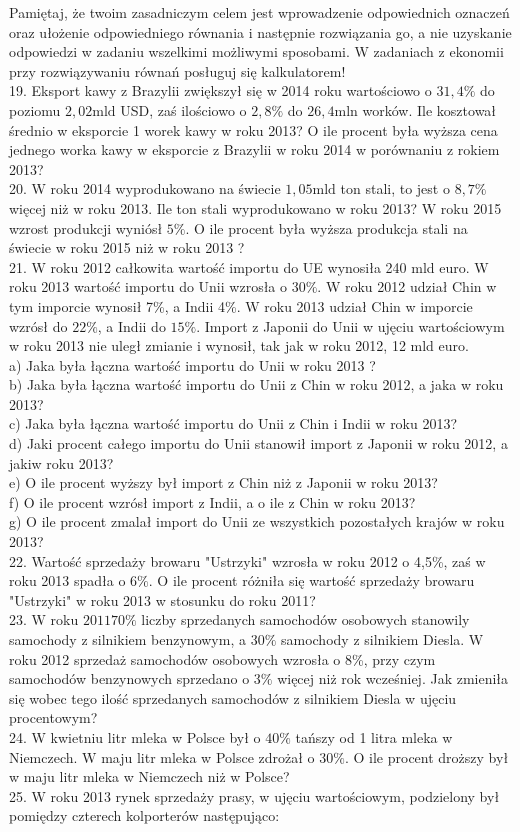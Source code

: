 \documentclass[10pt]{article}
\begin{document}
Pamiętaj, że twoim zasadniczym celem jest wprowadzenie odpowiednich oznaczeń oraz ułożenie odpowiedniego równania i następnie rozwiązania go, a nie uzyskanie odpowiedzi w zadaniu wszelkimi możliwymi sposobami. W zadaniach z ekonomii przy rozwiązywaniu równań posługuj się kalkulatorem!\\
19. Eksport kawy z Brazylii zwiększył się w 2014 roku wartościowo o \(31,4 \%\) do poziomu \(2,02 \mathrm{mld}\) USD, zaś ilościowo o \(2,8 \%\) do \(26,4 \mathrm{mln}\) worków. Ile kosztował średnio w eksporcie 1 worek kawy w roku 2013? O ile procent była wyższa cena jednego worka kawy w eksporcie z Brazylii w roku 2014 w porównaniu z rokiem 2013?\\
20. W roku 2014 wyprodukowano na świecie \(1,05 \mathrm{mld}\) ton stali, to jest o \(8,7 \%\) więcej niż w roku 2013. Ile ton stali wyprodukowano w roku 2013? W roku 2015 wzrost produkcji wyniósł \(5 \%\). O ile procent była wyższa produkcja stali na świecie w roku 2015 niż w roku 2013 ?\\
21. W roku 2012 całkowita wartość importu do UE wynosiła 240 mld euro. W roku 2013 wartość importu do Unii wzrosła o \(30 \%\). W roku 2012 udział Chin w tym imporcie wynosił 7\%, a Indii 4\%. W roku 2013 udział Chin w imporcie wzrósł do \(22 \%\), a Indii do \(15 \%\). Import z Japonii do Unii w ujęciu wartościowym w roku 2013 nie uległ zmianie i wynosił, tak jak w roku 2012, 12 mld euro.\\
a) Jaka była łączna wartość importu do Unii w roku 2013 ?\\
b) Jaka była łączna wartość importu do Unii z Chin w roku 2012, a jaka w roku 2013?\\
c) Jaka była łączna wartość importu do Unii z Chin i Indii w roku 2013?\\
d) Jaki procent całego importu do Unii stanowił import z Japonii w roku 2012, a jakiw roku 2013?\\
e) O ile procent wyższy był import z Chin niż z Japonii w roku 2013?\\
f) O ile procent wzrósł import z Indii, a o ile z Chin w roku 2013?\\
g) O ile procent zmalał import do Unii ze wszystkich pozostałych krajów w roku 2013?\\
22. Wartość sprzedaży browaru "Ustrzyki" wzrosła w roku 2012 o 4,5\%, zaś w roku 2013 spadła o \(6 \%\). O ile procent różniła się wartość sprzedaży browaru "Ustrzyki" w roku 2013 w stosunku do roku 2011?\\
23. W roku \(201170 \%\) liczby sprzedanych samochodów osobowych stanowily samochody z silnikiem benzynowym, a \(30 \%\) samochody z silnikiem Diesla. W roku 2012 sprzedaż samochodów osobowych wzrosła o 8\%, przy czym samochodów benzynowych sprzedano o \(3 \%\) więcej niż rok wcześniej. Jak zmieniła się wobec tego ilość sprzedanych samochodów z silnikiem Diesla w ujęciu procentowym?\\
24. W kwietniu litr mleka w Polsce był o \(40 \%\) tańszy od 1 litra mleka w Niemczech. W maju litr mleka w Polsce zdrożał o \(30 \%\). O ile procent droższy był w maju litr mleka w Niemczech niż w Polsce?\\
25. W roku 2013 rynek sprzedaży prasy, w ujęciu wartościowym, podzielony był pomiędzy czterech kolporterów następująco:
\end{document}
